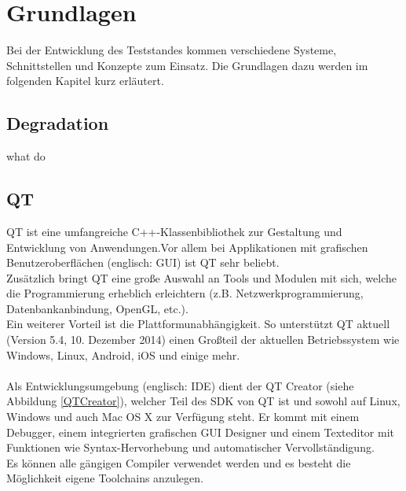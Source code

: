\chapter{Grundlagen}
\label{chapter_Grundlagen}

Bei der Entwicklung des Teststandes kommen verschiedene Systeme, Schnittstellen und Konzepte zum Einsatz. Die Grundlagen dazu werden im folgenden Kapitel kurz erläutert.

\section{Degradation}
what do


\section{QT}
QT ist eine umfangreiche C++-Klassenbibliothek zur Gestaltung und Entwicklung von Anwendungen.Vor allem bei Applikationen mit grafischen Benutzeroberflächen (englisch: \ac{GUI}) ist QT sehr beliebt. \\
Zusätzlich bringt QT eine große Auswahl an Tools und Modulen mit sich, welche die Programmierung erheblich erleichtern (z.B. Netzwerkprogrammierung, Datenbankanbindung, OpenGL, etc.). \\
Ein weiterer Vorteil ist die Plattformunabhängigkeit. So unterstützt QT aktuell (Version 5.4, 10. Dezember 2014) einen Großteil der aktuellen Betriebssystem wie Windows, Linux, Android, iOS und einige mehr.
\\\\
Als Entwicklungsumgebung (englisch: \ac{IDE}) dient der QT Creator (siehe Abbildung \ref{QTCreator}), welcher Teil des \ac{SDK} von QT ist und sowohl auf Linux, Windows und auch Mac OS X zur Verfügung steht. Er kommt mit einem Debugger, einem integrierten grafischen \ac{GUI} Designer und einem Texteditor mit Funktionen wie Syntax-Hervorhebung und automatischer Vervollständigung. \\
Es können alle gängigen Compiler verwendet werden und es besteht die Möglichkeit eigene Toolchains anzulegen. 

